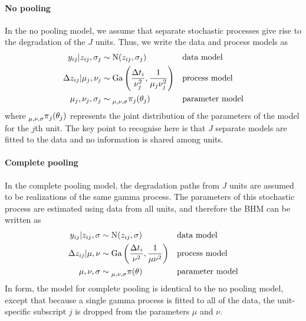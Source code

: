 \documentclass{article}
\begin{document}
\paragraph{No pooling} In the no pooling model, we assume that separate stochastic processes give rise to the degradation of the $J$ units. Thus, we write the data and process models as 
\begin{align*} 
    y_{ij}|z_{ij}, \sigma_j & \sim \mbox{N}(z_{ij}, \sigma_j)  && \mbox{data model} \\
    \Delta z_{ij}|\mu_j, \nu_j & \sim \mbox{Ga} \left( \frac{\Delta t_{i}}{\nu_j^2}, \frac{1}{\mu_j \nu_j^2} \right) && \mbox{process model} \\
    \mu_j, \nu_j, \sigma_j & \sim \prescript{}{\mu,\nu,\sigma}{\pi}_j (\theta_j) && \mbox{parameter model} 
\end{align*}
where $\prescript{}{\mu,\nu,\sigma}{\pi}_j(\theta_j)$ represents the joint distribution of the parameters of the model for the $j$th unit. The key point to recognise here is that $J$ separate models are fitted to the data and no information is shared among units.

\paragraph{Complete pooling} In the complete pooling model, the degradation paths from $J$ units are assumed to be realizations of the same gamma process. The parameters of this stochastic process are estimated using data from all units, and therefore the BHM can be written as
\begin{align*} 
    y_{ij}|z_{ij}, \sigma & \sim \mbox{N}(z_{ij}, \sigma)  && \mbox{data model} \\
    \Delta z_{ij}|\mu, \nu & \sim \mbox{Ga} \left( \frac{\Delta t_{i}}{\nu^2}, \frac{1}{\mu \nu^2} \right) && \mbox{process model} \\
    \mu, \nu, \sigma & \sim \prescript{}{\mu,\nu,\sigma}{\pi}(\theta) && \mbox{parameter model} 
\end{align*}
In form, the model for complete pooling is identical to the no pooling model, except that because a single gamma process is fitted to all of the data, the unit-specific subscript $j$ is dropped from the parameters $\mu$ and $\nu$.
\end{document}
